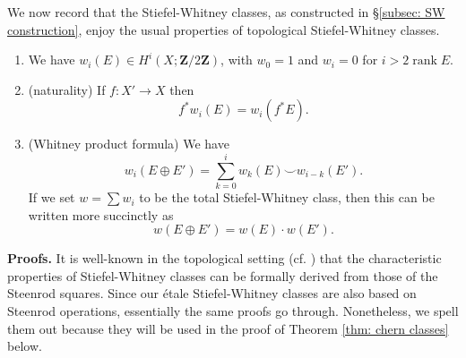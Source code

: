 \documentclass[10pt, reqno]{amsart}
\numberwithin{equation}{subsection}
\newcommand{\Z}{\mathbf{Z}}
\DeclareMathOperator{\rank}{rank}
\theoremstyle{remark}
\begin{document}
We now record that the Stiefel-Whitney classes, as constructed in \S \ref{subsec: SW construction}, enjoy the usual properties of topological Stiefel-Whitney classes. 

\begin{enumerate}
\item We have $w_i(E) \in H^i(X; \Z/2\Z)$, with $w_0=1$ and $w_i=0$ for $i> 2 \rank E$. 

\item ({\sc naturality}) If $f \colon X' \rightarrow X$ then 
\[
f^* w_i(E) = w_i(f^* E).
\]
\item ({\sc Whitney product formula}) We have 
\[
w_i(E \oplus E') = \sum_{k=0}^i w_k(E) \smile w_{i-k}(E').
\]
If we set $w = \sum w_i$ to be the total Stiefel-Whitney class, then this can be written more succinctly as
\[
w(E \oplus E') = w(E) \cdot w(E').
\]

\end{enumerate}

\noindent \textbf{Proofs.} 
It is well-known in the topological setting (cf. \cite[\S 8]{MS74}) that the characteristic properties of Stiefel-Whitney classes can be formally derived from those of the Steenrod squares. Since our \'{e}tale Stiefel-Whitney classes are also based on Steenrod operations, essentially the same proofs go through. Nonetheless, we spell them out because they will be used in the proof of Theorem \ref{thm: chern classes} below. 
\end{document}
